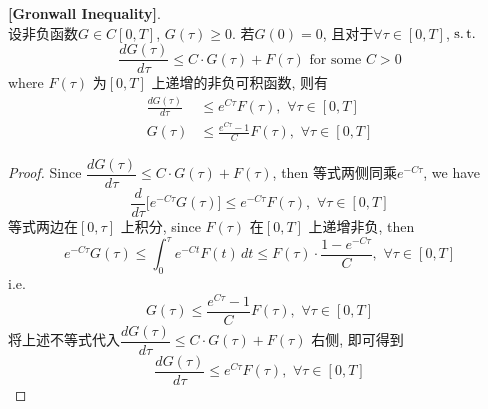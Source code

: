 	\begin{lemma}\label{lemma A.4.2}
		\textbf{[Gronwall Inequality]}. \\
		设非负函数$G \in C[0 , T]$, $G(\tau) \geq 0$. 若$G(0) = 0$, 且对于$\forall \tau \in [0 , T]$, $\operatorname{s.t.}$
		\[ \frac{dG(\tau)}{d \tau} \leq C \cdot G(\tau) + F(\tau) \,\, \text{for some} \,\, C > 0 \]
		where $F(\tau)$ 为$[0 , T]$ 上递增的非负可积函数, 则有
		\begin{align*}
			\frac{dG(\tau)}{d\tau} &\leq e^{C\tau} F(\tau) , \,\, \forall \tau \in [0 , T] \\
			G(\tau) &\leq \frac{e^{C\tau} - 1}{C} F(\tau) , \,\, \forall \tau \in [0 , T]
		\end{align*}
		
		\vspace*{8em}
		
		\begin{proof}
			Since $\dfrac{dG(\tau)}{d \tau} \leq C \cdot G(\tau) + F(\tau)$, then 等式两侧同乘$e^{-C\tau}$, we have
			\[ \frac{d}{d\tau} \Big[ e^{-C\tau} G(\tau) \Big] \leq e^{-C\tau} F(\tau) , \,\, \forall \tau \in [0 , T] \]
			等式两边在$[0 , \tau]$ 上积分, since $F(\tau)$ 在$[0 , T]$ 上递增非负, then
			\[ e^{-C\tau} G(\tau) \leq \int_{0}^\tau e^{-Ct} F(t) \, dt \leq F(\tau) \cdot \frac{1 - e^{-C\tau}}{C} , \,\, \forall \tau \in [0 , T] \]
			i.e.
			\[ G(\tau) \leq \frac{e^{C\tau} - 1}{C} F(\tau) , \,\, \forall \tau \in [0 , T] \]
			将上述不等式代入$\dfrac{dG(\tau)}{d \tau} \leq C \cdot G(\tau) + F(\tau)$ 右侧, 即可得到
			\[ \frac{dG(\tau)}{d\tau} \leq e^{C\tau} F(\tau) , \,\, \forall \tau \in [0 , T] \]
		\end{proof}
	\end{lemma}
	
	\newpage
	
